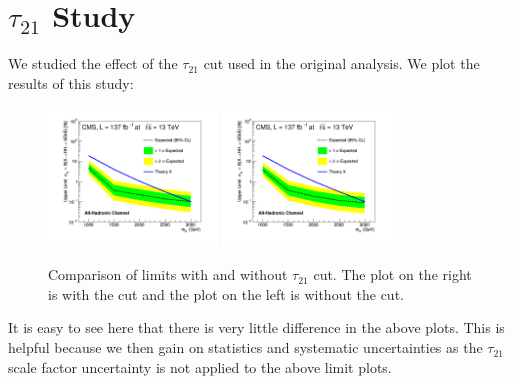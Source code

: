 \section{$\tau_{21}$ Study}
We studied the effect of the $\tau_{21}$ cut used in the original analysis. We plot the results of this study:
\begin{figure}[!htb]
	\centering
	\includegraphics[width=0.4\textwidth]{Figures/limits_combine_137fb_dak8MDHbb_signalsAll_RadNar_750rmcut_yestau21.png}
	\includegraphics[width=0.4\textwidth]{Figures/limits_combine_137fb_dak8MDHbb_signalsAll_RadNar_750rmcut_notau21.png}
	\caption{Comparison of limits with and without $\tau_{21}$ cut. The plot on the right is with the cut and the plot on the left is without the cut.}
	\label{fig:tau21study}
\end{figure}
It is easy to see here that there is very little difference in the above plots. This is helpful because we then gain on statistics and systematic uncertainties as the $\tau_{21}$ scale factor uncertainty is not applied to the above limit plots.
\pagebreak
